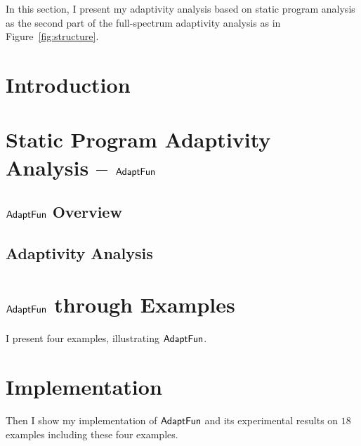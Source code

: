In this section, I present my 
adaptivity analysis based on static program analysis as the second part of 
the full-spectrum adaptivity analysis as in Figure~\ref{fig:structure}. 
\section{Introduction}
\label{sec:static-intro}


\section{Static Program Adaptivity Analysis -- $\textsf{AdaptFun}$}
\label{sec:static-adapfun}
% 

\subsection{$\textsf{AdaptFun}$ Overview}
\label{sec:static-overview}


% 

% 

\subsection{Adaptivity Analysis}
\label{sec:static-adapt}


\section{$\textsf{AdaptFun}$ through Examples}
\label{sec:static-examples}
%
%
I present four examples, illustrating $\textsf{AdaptFun}$.
% 




% 
\section{Implementation}
\label{sec:static-implementation}
Then I show my implementation of $\textsf{AdaptFun}$ and its experimental results on $18$ examples including these four examples.


